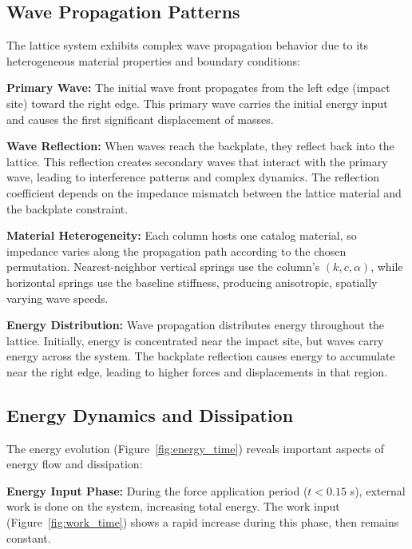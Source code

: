 \documentclass[11pt,a4paper]{article}
\begin{document}
\subsection{Wave Propagation Patterns}

\noindent The lattice system exhibits complex wave propagation behavior due to its heterogeneous material properties and boundary conditions: \newline

\noindent \textbf{Primary Wave:} The initial wave front propagates from the left edge (impact site) toward the right edge. This primary wave carries the initial energy input and causes the first significant displacement of masses. \newline

\noindent \textbf{Wave Reflection:} When waves reach the backplate, they reflect back into the lattice. This reflection creates secondary waves that interact with the primary wave, leading to interference patterns and complex dynamics. The reflection coefficient depends on the impedance mismatch between the lattice material and the backplate constraint. \newline

\noindent \textbf{Material Heterogeneity:} Each column hosts one catalog material, so impedance varies along the propagation path according to the chosen permutation. Nearest-neighbor vertical springs use the column's $(k,c,\alpha)$, while horizontal springs use the baseline stiffness, producing anisotropic, spatially varying wave speeds. \newline

\noindent \textbf{Energy Distribution:} Wave propagation distributes energy throughout the lattice. Initially, energy is concentrated near the impact site, but waves carry energy across the system. The backplate reflection causes energy to accumulate near the right edge, leading to higher forces and displacements in that region. \newline

\subsection{Energy Dynamics and Dissipation}

\noindent The energy evolution (Figure~\ref{fig:energy_time}) reveals important aspects of energy flow and dissipation: \newline

\noindent \textbf{Energy Input Phase:} During the force application period ($t < 0.15$ s), external work is done on the system, increasing total energy. The work input (Figure~\ref{fig:work_time}) shows a rapid increase during this phase, then remains constant. \newline
\end{document}
